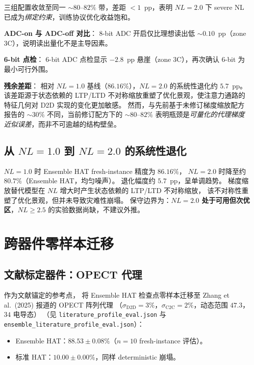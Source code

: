 三组配置收敛至同一 $\sim$$80$--$82\%$ 带，差距 $<1$~pp，表明 $NL=2.0$ 下 severe NL 已成为\emph{绑定约束}，训练协议优化收益饱和。

\textbf{ADC-on 与 ADC-off 对比}：
8-bit ADC 开启仅比理想读出低 $\sim$$0.10$~pp（zone 3C），说明读出量化不是主导因素。

\textbf{6-bit 点检}：
6-bit ADC 点检显示 $-2.8$~pp 悬崖（zone 3C），再次确认 6-bit 为最小可行外围。

\textbf{残余差距}：
相对 $NL=1.0$ 基线（$86.16\%$），$NL=2.0$ 的系统性退化约 $5.7$~pp。
该差距源于状态依赖的 LTP/LTD 不对称缩放重塑了优化景观，使注意力通路的特征几何对 D2D 实现的变化更加敏感。
然而，与先前基于未修订梯度缩放配方报告的 $\sim$$30\%$ 不同，当前修订配方下的 $\sim$$80$--$82\%$ 表明瓶颈是\emph{可量化的代理梯度近似误差}，而非不可逾越的结构壁垒。

\subsection{从 $NL=1.0$ 到 $NL=2.0$ 的系统性退化}

$NL=1.0$ 时 Ensemble HAT fresh-instance 精度为 $86.16\%$，
$NL=2.0$ 时降至约 $80.7\%$（Ensemble HAT，均匀噪声）。
退化幅度约 $5.7$~pp，呈单调趋势。
梯度缩放替代模型在 $NL$ 增大时产生状态依赖的 LTP/LTD 不对称缩放，
该不对称性重塑了优化景观，但并未导致灾难性崩塌。
保守边界为：\textbf{$NL=2.0$ 处于可用但次优区}，$NL \ge 2.5$ 的实验数据尚缺，不建议外推。


\section{跨器件零样本迁移}
\label{sec:cross-device-transfer}

\subsection{文献标定器件：OPECT 代理}

作为文献锚定的参考点，
将 Ensemble HAT 检查点零样本迁移至 Zhang et al.~(2025) 报道的 OPECT 阵列代理
（$\sigma_{\mathrm{D2D}}=3\%$，$\sigma_{\mathrm{C2C}}=2\%$，动态范围 $47.3$，$34$ 电导态）
（见 \texttt{literature\_profile\_eval.json} 与 \texttt{ensemble\_literature\_profile\_eval.json}）：
\begin{itemize}
    \item Ensemble HAT：$\mathbf{88.53\pm0.08\%}$（$n=10$ fresh-instance 评估）。
    \item 标准 HAT：$\mathbf{10.00\pm0.00\%}$，同样 deterministic 崩塌。
\end{itemize}

